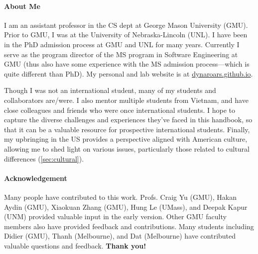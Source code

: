\documentclass[oneside,11pt,dvipsnames]{book}
\begin{document}
\paragraph{About Me} I am an assistant professor in the CS dept at George Mason University (GMU). Prior to GMU, I was at the University of Nebraska-Lincoln (UNL). I have been in the PhD admission process at GMU and UNL for many years.  Currently I serve as the program director of the MS program in Software Engineering at GMU (thus also have some experience with the MS admission process---which is quite different than PhD). My personal and lab website is at \href{https://dynaroars.github.io}{dynaroars.github.io}.

Though I was not an international student, many of my students and collaborators are/were. I also mentor multiple students from Vietnam, and have close colleagues and friends who were once international students. I hope to capture the diverse challenges and experiences they've faced in this handbook, so that it  can be a valuable resource for prospective international students.
Finally, my upbringing in the US provides a perspective aligned with American culture, allowing me to shed light on various issues, particularly those related to cultural differences (\autoref{sec:cultural}).




\paragraph{Acknowledgement} Many people have contributed to this work.
Profs. Craig Yu (GMU), Hakan Aydin (GMU), 
Xiaokuan Zhang (GMU), Hung Le (UMass), and Deepak Kapur (UNM) provided valuable input in the early version. Other GMU faculty members also have provided feedback and contributions.  Many students including Didier (GMU), Thanh (Melbourne), and Dat (Melbourne) have contributed valuable questions and feedback. \textbf{Thank you!}

%
%
\end{document}
